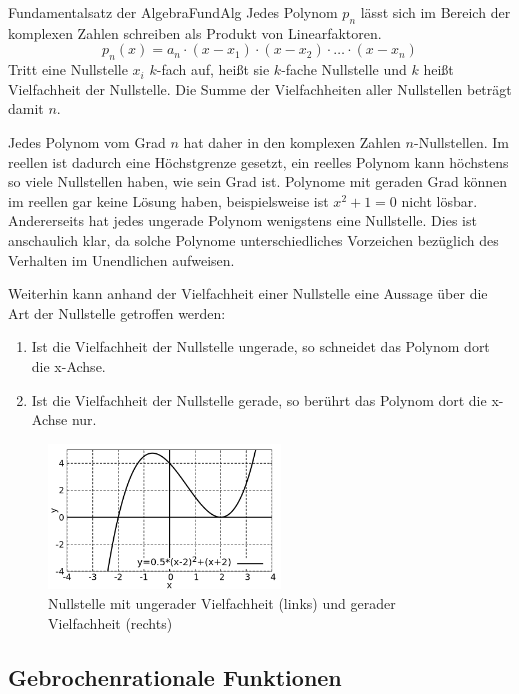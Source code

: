 \begin{statement}{Fundamentalsatz der Algebra}{FundAlg}
    Jedes Polynom $p_n$ lässt sich im Bereich der komplexen Zahlen schreiben als Produkt von Linearfaktoren.
    $$
        p_n(x) = a_n \cdot (x-x_1) \cdot (x-x_2) \cdot \dots \cdot (x-x_n)
    $$
    Tritt eine Nullstelle $x_i$ $k$-fach auf, heißt sie $k$-fache Nullstelle und $k$ heißt Vielfachheit der Nullstelle. Die Summe der Vielfachheiten aller Nullstellen beträgt damit $n$.
\end{statement}

Jedes Polynom vom Grad $n$ hat daher in den komplexen Zahlen $n$-Nullstellen. Im reellen ist dadurch eine Höchstgrenze gesetzt, ein reelles Polynom kann höchstens so viele Nullstellen haben, wie sein Grad ist.  Polynome mit geraden Grad können im reellen gar keine Lösung haben, beispielsweise ist $x^2+1=0$ nicht lösbar. Andererseits hat jedes ungerade Polynom wenigstens eine Nullstelle. Dies ist anschaulich klar, da solche Polynome unterschiedliches Vorzeichen bezüglich des Verhalten im Unendlichen aufweisen.

Weiterhin kann anhand der Vielfachheit einer Nullstelle eine Aussage über die Art der Nullstelle getroffen werden:

\begin{enumerate}
    \item Ist die Vielfachheit der Nullstelle ungerade, so schneidet das Polynom dort die x-Achse.
    \item Ist die Vielfachheit der Nullstelle gerade, so berührt das Polynom dort die x-Achse nur.
\end{enumerate}


\begin{figure}
    \centering
    \includegraphics[width=0.55\textwidth]{./gnuplot/polynom-root-multiplicity}
    \caption{Nullstelle mit ungerader Vielfachheit (links) und gerader Vielfachheit (rechts)}
    \label{fig:PolyRootMulti}
\end{figure}

\subsection{Gebrochenrationale Funktionen}

